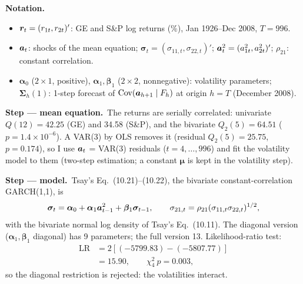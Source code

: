 \documentclass[11pt,a4paper]{article}
\newenvironment{notacao}{\par\smallskip\noindent\textbf{Notation.}\begin{itemize}[leftmargin=1.4em,topsep=1pt,itemsep=0pt]\small}{\end{itemize}}
\newcommand{\passo}[2]{\par\smallskip\noindent\textbf{Step --- #1.}~#2}
\newcommand{\bmu}{\bm{\mu}}\newcommand{\bphi}{\bm{\phi}}\newcommand{\bSigma}{\bm{\Sigma}}
\begin{document}
\begin{sol}
\begin{notacao}
\item $\bm{r}_t=(r_{1t},r_{2t})'$: GE and S\&P log returns (\%), Jan 1926--Dec 2008, $T=996$.
\item $\bm{a}_t$: shocks of the mean equation; $\bm\sigma_t=(\sigma_{11,t},\sigma_{22,t})'$; $\bm{a}_t^2=(a_{1t}^2,a_{2t}^2)'$; $\rho_{21}$: constant correlation.
\item $\bm\alpha_0$ ($2\times1$, positive), $\bm\alpha_1,\bm\beta_1$ ($2\times2$, nonnegative): volatility parameters;
$\bSigma_h(1)$: 1-step forecast of $\mathrm{Cov}(\bm{a}_{h+1}\mid F_h)$ at origin $h=T$ (December 2008).
\end{notacao}

\passo{mean equation}{The returns are serially correlated: univariate $Q(12)=42.25$ (GE) and 34.58 (S\&P),
and the bivariate $Q_2(5)=64.51$ ($p=1.4\times10^{-6}$). A VAR(3) by OLS removes it (residual
$Q_2(5)=25.75$, $p=0.174$), so I use $\bm{a}_t$ = VAR(3) residuals ($t=4,\dots,996$) and fit the volatility
model to them (two-step estimation; a constant $\bmu$ is kept in the volatility step).}

\passo{model}{Tsay's Eq.~(10.21)--(10.22), the bivariate constant-correlation GARCH(1,1), is
\begin{equation}
\bm\sigma_t=\bm\alpha_0+\bm\alpha_1\bm{a}_{t-1}^2+\bm\beta_1\bm\sigma_{t-1},\qquad
\sigma_{21,t}=\rho_{21}(\sigma_{11,t}\sigma_{22,t})^{1/2},\label{eq:q10m}
\end{equation}
with the bivariate normal log density of Tsay's Eq.~(10.11). The diagonal version ($\bm\alpha_1,\bm\beta_1$
diagonal) has 9 parameters; the full version 13. Likelihood-ratio test:
\begin{align}
\mathrm{LR}&=2\left[(-5799.83)-(-5807.77)\right]\nonumber\\
&=15.90,\qquad \chi^2_4\ p=0.003,\nonumber
\end{align}
so the diagonal restriction is rejected: the volatilities interact.}


\end{sol}
\end{document}
